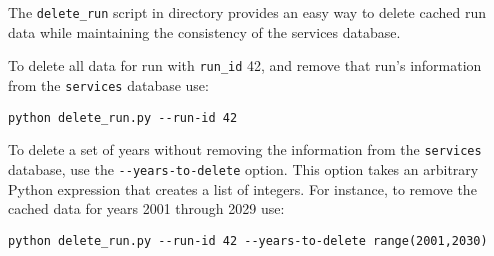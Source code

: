 The \verb|delete_run| script in  directory
provides an easy way to delete cached run data while maintaining the
consistency of the services database. 

To delete all data for run with \verb|run_id| 42, and remove that run's
information from the \verb|services|
database use:

\pythonindex
\begin{verbatim}
python delete_run.py --run-id 42
\end{verbatim}

To delete a set of years without removing the information from the
\verb|services| database, use the \verb|--years-to-delete| option.  This
option takes an arbitrary Python \pythonindex expression that creates a list of integers.
For instance, to remove the cached data for years 2001 through 2029 use:

\pythonindex
\begin{verbatim}
python delete_run.py --run-id 42 --years-to-delete range(2001,2030)
\end{verbatim}

